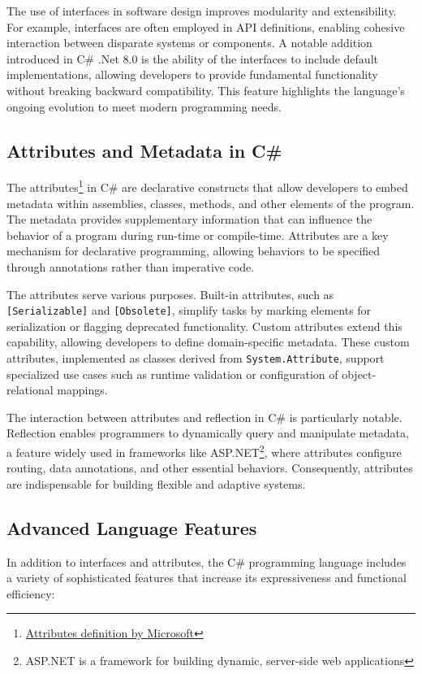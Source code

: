 The use of interfaces in software design improves modularity and extensibility. For example, interfaces are often employed in API definitions, enabling cohesive interaction between disparate systems or components. A notable addition introduced in C\# .Net 8.0 is the ability of the interfaces to include default implementations, allowing developers to provide fundamental functionality without breaking backward compatibility. This feature highlights the language's ongoing evolution to meet modern programming needs.

\subsection{Attributes and Metadata in C\#}

The attributes\footnote{\href{https://learn.microsoft.com/en-us/dotnet/csharp/advanced-topics/reflection-and-attributes/}{Attributes definition by Microsoft}} in C\# are declarative constructs that allow developers to embed metadata within assemblies, classes, methods, and other elements of the program. The metadata provides supplementary information that can influence the behavior of a program during run-time or compile-time. Attributes are a key mechanism for declarative programming, allowing behaviors to be specified through annotations rather than imperative code.

The attributes serve various purposes. Built-in attributes, such as \texttt{[Serializable]} and \texttt{[Obsolete]}, simplify tasks by marking elements for serialization or flagging deprecated functionality. Custom attributes extend this capability, allowing developers to define domain-specific metadata. These custom attributes, implemented as classes derived from \texttt{System.Attribute}, support specialized use cases such as runtime validation or configuration of object-relational mappings.

The interaction between attributes and reflection in C\# is particularly notable. Reflection enables programmers to dynamically query and manipulate metadata, a feature widely used in frameworks like ASP.NET\footnote{ASP.NET is a framework for building dynamic, server-side web applications}, where attributes configure routing, data annotations, and other essential behaviors. Consequently, attributes are indispensable for building flexible and adaptive systems.

\subsection{Advanced Language Features}
In addition to interfaces and attributes, the C\# programming language includes a variety of sophisticated features that increase its expressiveness and functional efficiency:


